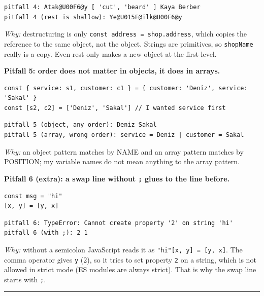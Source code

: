 \begin{lstlisting}
pitfall 4: Atak@U00F6@y [ 'cut', 'beard' ] Kaya Berber
pitfall 4 (rest is shallow): Ye@U015F@ilk@U00F6@y
\end{lstlisting}

\emph{Why:} destructuring is only \passthrough{\lstinline!const address = shop.address!}, which copies the reference to the same object, not the object.
Strings are primitives, so \passthrough{\lstinline!shopName!} really is a copy. Even rest only makes a new object at the first level.

\textbf{Pitfall 5: order does not matter in objects, it does in arrays.}

\begin{lstlisting}
const { service: s1, customer: c1 } = { customer: 'Deniz', service: 'Sakal' }
const [s2, c2] = ['Deniz', 'Sakal'] // I wanted service first
\end{lstlisting}

\begin{lstlisting}
pitfall 5 (object, any order): Deniz Sakal
pitfall 5 (array, wrong order): service = Deniz | customer = Sakal
\end{lstlisting}

\emph{Why:} an object pattern matches by NAME and an array pattern matches by POSITION; my variable names do not mean anything to the array pattern.

\textbf{Pitfall 6 (extra): a swap line without \passthrough{\lstinline!;!} glues to the line before.}

\begin{lstlisting}
const msg = "hi"
[x, y] = [y, x]
\end{lstlisting}

\begin{lstlisting}
pitfall 6: TypeError: Cannot create property '2' on string 'hi'
pitfall 6 (with ;): 2 1
\end{lstlisting}

\emph{Why:} without a semicolon JavaScript reads it as \passthrough{\lstinline!"hi"[x, y] = [y, x]!}. The comma operator gives \passthrough{\lstinline!y!} (2), so it tries to set
property \passthrough{\lstinline!2!} on a string, which is not allowed in strict mode (ES modules are always strict). That is why the swap line starts with \passthrough{\lstinline!;!}.

\begin{center}\rule{0.5\linewidth}{0.5pt}\end{center}

